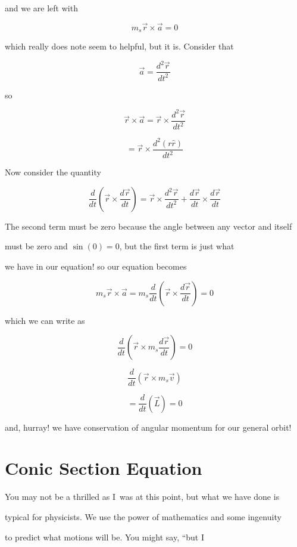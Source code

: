 and we are left with 

$$m_{s}\overrightarrow{r}\times \overrightarrow{a}=0$$

which really does note seem to helpful, but it is. Consider that 

$$\overrightarrow{a}=\frac{d^{2}\overrightarrow{r}}{dt^{2}}$$

so 

$$\overrightarrow{r}\times \overrightarrow{a}=\overrightarrow{r}\times \frac{d^{2}\overrightarrow{r}}{dt^{2}}$$

$$=\overrightarrow{r}\times \frac{d^{2}\left( r\hat{r}\right) }{dt^{2}}$$


Now consider the quantity 

$$\frac{d}{dt}\left( \overrightarrow{r}\times \frac{d\overrightarrow{r}}{dt}\right)=\overrightarrow{r}\times\frac{d^{2}\overrightarrow{r}}{dt^{2}}+\frac{d\overrightarrow{r}}{dt}\times \frac{d\overrightarrow{r}}{dt}$$

The second term must be zero because the angle between any vector and itself

must be zero and $\sin \left( 0\right) =0$, but the first term is just what

we have in our equation! so our equation becomes%

$$m_{s}\overrightarrow{r}\times \overrightarrow{a}=m_{s}\frac{d}{dt}\left( \overrightarrow{r}\times \frac{d\overrightarrow{r}}{dt}\right) =0$$

which we can write as%

$$\frac{d}{dt}\left( \overrightarrow{r}\times m_{s}\frac{d\overrightarrow{r}}{dt}\right) =0$$

$$\frac{d}{dt}\left( \overrightarrow{r}\times m_{s}\overrightarrow{v}\right) $$



$$=\frac{d}{dt}\left( \overrightarrow{L}\right) =0$$

and, hurray! we have conservation of angular momentum for our general orbit!


\section{Conic Section Equation}


You may not be a thrilled as I\ was at this point, but what we have done is

typical for physicists. We use the power of mathematics and some ingenuity

to predict what motions will be. You might say, \textquotedblleft but I\

